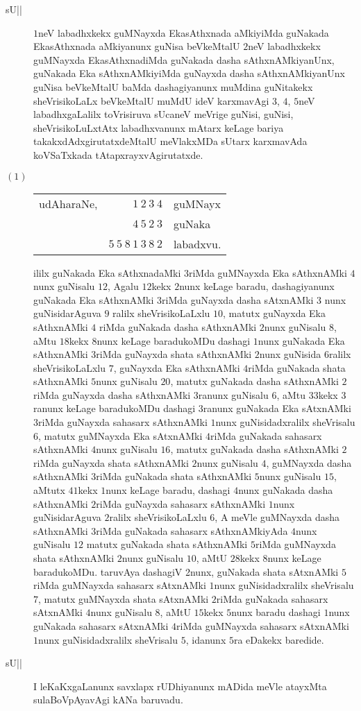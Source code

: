 \begin{description}
\item[sU||] $1$neV labadhxkekx guMNayxda EkasAthxnada aMkiyiMda
      guNakada EkasAthxnada aMkiyanunx guNisa beVkeMtalU $2$neV
      \hbox{labadhxkekx} guMNayxda EkasAthxnadiMda guNakada dasha
      sAthxnAMkiyanUnx, guNakada Eka sAthxnAMkiyiMda guNayxda dasha
      sAthxnAMkiyanUnx guNisa beVkeMtalU baMda dashagiyanunx muMdina
      guNitakekx sheVrisikoLaLx beVkeMtalU muMdU ideV karxmavAgi $3$,
      $4$, $5$neV labadhxgaLalilx toVrisiruva sUcaneV meVrige guNisi,
      guNisi, sheVrisikoLuLxtAtx labadhxvanunx mAtarx keLage bariya
      takakxdAdxgirutatxdeMtalU meVlakxMDa sUtarx karxmavAda
      koVSaTxkada tAtapxrayxvAgirutatxde. 

\item[$(1)$]
\begin{tabular}[t]{rrl}
        udAharaNe, & $1~2~3~4$ & guMNayx\\
                  & $4~5~2~3$ & guNaka\\
                  \cline{2-2}
        & $5~5~8~1~3~8~2$ & labadxvu.
\end{tabular}

ililx guNakada Eka sAthxnadaMki $3$riMda guMNayxda Eka sAthxnAMki $4$nunx guNisalu $12$, Agalu $12$kekx
$2$nunx keLage baradu, dashagiyanunx guNakada Eka sAthxnAMki $3$riMda
guNayxda dasha sAtxnAMki $3$ nunx guNisidarAguva $9$ ralilx
sheVrisikoLaLxlu $10$, matutx guNayxda Eka sAthxnAMki $4$ riMda
guNakada dasha sAthxnAMki $2$nunx guNisalu $8$, aMtu $18$kekx $8$nunx
keLage baradukoMDu dashagi $1$nunx guNakada Eka sAthxnAMki $3$riMda
guNayxda shata sAthxnAMki $2$nunx guNisida $6$ralilx sheVrisikoLaLxlu
$7$, guNayxda Eka sAthxnAMki $4$riMda guNakada shata sAthxnAMki
$5$nunx guNisalu $20$, matutx guNakada dasha sAthxnAMki $2$riMda
guNayxda dasha sAthxnAMki $3$ranunx guNisalu $6$, aMtu $33$kekx $3$ranunx
keLage baradukoMDu dashagi $3$ranunx guNakada Eka sAtxnAMki $3$riMda
guNayxda sahasarx sAthxnAMki $1$nunx guNisidadxralilx sheVrisalu $6$,
matutx guMNayxda Eka sAtxnAMki $4$riMda guNakada sahasarx sAthxnAMki
$4$nunx guNisalu $16$, matutx guNakada dasha sAthxnAMki $2$riMda
guNayxda shata sAthxnAMki $2$nunx guNisalu $4$, guMNayxda dasha
sAthxnAMki $3$riMda guNakada shata sAthxnAMki $5$nunx guNisalu $15$,
aMtutx $41$kekx $1$nunx keLage baradu, dashagi $4$nunx guNakada dasha
sAthxnAMki $2$riMda guNayxda sahasarx sAthxnAMki $1$nunx
guNisidarAguva $2$ralilx sheVrisikoLaLxlu $6$, A meVle guMNayxda dasha
sAthxnAMki $3$riMda guNakada sahasarx sAthxnAMkiyAda $4$nunx guNisalu
$12$ matutx guNakada shata sAthxnAMki $5$riMda guMNayxda shata
sAthxnAMki $2$nunx guNisalu $10$, aMtU $28$kekx $8$nunx keLage
baradukoMDu. taruvAya dashagiV 2nunx, guNakada shata sAtxnAMki
$5$riMda guMNayxda sahasarx sAtxnAMki $1$nunx guNisidadxralilx
sheVrisalu $7$, matutx guMNayxda shata sAtxnAMki $2$riMda guNakada
sahasarx sAtxnAMki $4$nunx guNisalu $8$, aMtU $15$kekx $5$nunx baradu
dashagi $1$nunx guNakada sahasarx sAtxnAMki $4$riMda guMNayxda
sahasarx sAtxnAMki $1$nunx guNisidadxralilx sheVrisalu $5$, idanunx
$5$ra eDakekx baredide.

\item[sU||] I leKaKxgaLanunx savxlapx rUDhiyanunx mADida meVle
atayxMta sulaBoVpAyavAgi kANa baruvadu.
\end{description}

